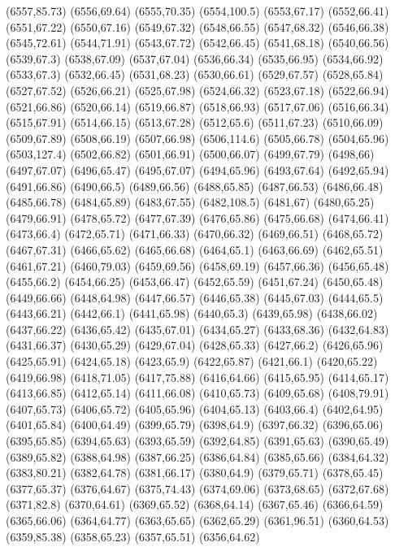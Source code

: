 (6557,85.73)
(6556,69.64)
(6555,70.35)
(6554,100.5)
(6553,67.17)
(6552,66.41)
(6551,67.22)
(6550,67.16)
(6549,67.32)
(6548,66.55)
(6547,68.32)
(6546,66.38)
(6545,72.61)
(6544,71.91)
(6543,67.72)
(6542,66.45)
(6541,68.18)
(6540,66.56)
(6539,67.3)
(6538,67.09)
(6537,67.04)
(6536,66.34)
(6535,66.95)
(6534,66.92)
(6533,67.3)
(6532,66.45)
(6531,68.23)
(6530,66.61)
(6529,67.57)
(6528,65.84)
(6527,67.52)
(6526,66.21)
(6525,67.98)
(6524,66.32)
(6523,67.18)
(6522,66.94)
(6521,66.86)
(6520,66.14)
(6519,66.87)
(6518,66.93)
(6517,67.06)
(6516,66.34)
(6515,67.91)
(6514,66.15)
(6513,67.28)
(6512,65.6)
(6511,67.23)
(6510,66.09)
(6509,67.89)
(6508,66.19)
(6507,66.98)
(6506,114.6)
(6505,66.78)
(6504,65.96)
(6503,127.4)
(6502,66.82)
(6501,66.91)
(6500,66.07)
(6499,67.79)
(6498,66)
(6497,67.07)
(6496,65.47)
(6495,67.07)
(6494,65.96)
(6493,67.64)
(6492,65.94)
(6491,66.86)
(6490,66.5)
(6489,66.56)
(6488,65.85)
(6487,66.53)
(6486,66.48)
(6485,66.78)
(6484,65.89)
(6483,67.55)
(6482,108.5)
(6481,67)
(6480,65.25)
(6479,66.91)
(6478,65.72)
(6477,67.39)
(6476,65.86)
(6475,66.68)
(6474,66.41)
(6473,66.4)
(6472,65.71)
(6471,66.33)
(6470,66.32)
(6469,66.51)
(6468,65.72)
(6467,67.31)
(6466,65.62)
(6465,66.68)
(6464,65.1)
(6463,66.69)
(6462,65.51)
(6461,67.21)
(6460,79.03)
(6459,69.56)
(6458,69.19)
(6457,66.36)
(6456,65.48)
(6455,66.2)
(6454,66.25)
(6453,66.47)
(6452,65.59)
(6451,67.24)
(6450,65.48)
(6449,66.66)
(6448,64.98)
(6447,66.57)
(6446,65.38)
(6445,67.03)
(6444,65.5)
(6443,66.21)
(6442,66.1)
(6441,65.98)
(6440,65.3)
(6439,65.98)
(6438,66.02)
(6437,66.22)
(6436,65.42)
(6435,67.01)
(6434,65.27)
(6433,68.36)
(6432,64.83)
(6431,66.37)
(6430,65.29)
(6429,67.04)
(6428,65.33)
(6427,66.2)
(6426,65.96)
(6425,65.91)
(6424,65.18)
(6423,65.9)
(6422,65.87)
(6421,66.1)
(6420,65.22)
(6419,66.98)
(6418,71.05)
(6417,75.88)
(6416,64.66)
(6415,65.95)
(6414,65.17)
(6413,66.85)
(6412,65.14)
(6411,66.08)
(6410,65.73)
(6409,65.68)
(6408,79.91)
(6407,65.73)
(6406,65.72)
(6405,65.96)
(6404,65.13)
(6403,66.4)
(6402,64.95)
(6401,65.84)
(6400,64.49)
(6399,65.79)
(6398,64.9)
(6397,66.32)
(6396,65.06)
(6395,65.85)
(6394,65.63)
(6393,65.59)
(6392,64.85)
(6391,65.63)
(6390,65.49)
(6389,65.82)
(6388,64.98)
(6387,66.25)
(6386,64.84)
(6385,65.66)
(6384,64.32)
(6383,80.21)
(6382,64.78)
(6381,66.17)
(6380,64.9)
(6379,65.71)
(6378,65.45)
(6377,65.37)
(6376,64.67)
(6375,74.43)
(6374,69.06)
(6373,68.65)
(6372,67.68)
(6371,82.8)
(6370,64.61)
(6369,65.52)
(6368,64.14)
(6367,65.46)
(6366,64.59)
(6365,66.06)
(6364,64.77)
(6363,65.65)
(6362,65.29)
(6361,96.51)
(6360,64.53)
(6359,85.38)
(6358,65.23)
(6357,65.51)
(6356,64.62)
